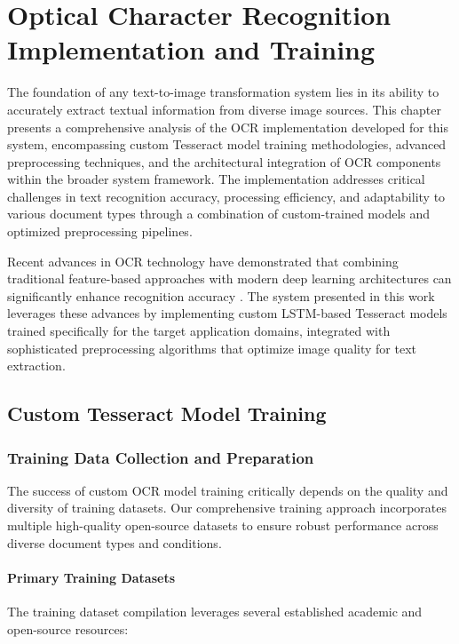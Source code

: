 \chapter{Optical Character Recognition Implementation and Training}

The foundation of any text-to-image transformation system lies in its ability to accurately extract textual information from diverse image sources. This chapter presents a comprehensive analysis of the OCR implementation developed for this system, encompassing custom Tesseract model training methodologies, advanced preprocessing techniques, and the architectural integration of OCR components within the broader system framework. The implementation addresses critical challenges in text recognition accuracy, processing efficiency, and adaptability to various document types through a combination of custom-trained models and optimized preprocessing pipelines.

Recent advances in OCR technology have demonstrated that combining traditional feature-based approaches with modern deep learning architectures can significantly enhance recognition accuracy \cite{clausner2020optical}. The system presented in this work leverages these advances by implementing custom LSTM-based Tesseract models trained specifically for the target application domains, integrated with sophisticated preprocessing algorithms that optimize image quality for text extraction.

\section{Custom Tesseract Model Training}

\subsection{Training Data Collection and Preparation}

The success of custom OCR model training critically depends on the quality and diversity of training datasets. Our comprehensive training approach incorporates multiple high-quality open-source datasets to ensure robust performance across diverse document types and conditions.

\subsubsection{Primary Training Datasets}

The training dataset compilation leverages several established academic and open-source resources:

